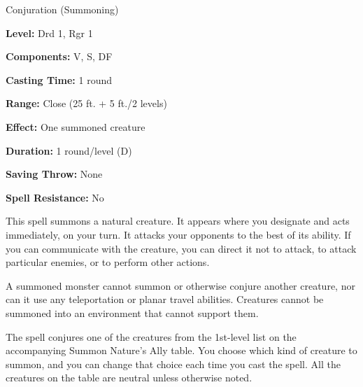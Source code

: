 
Conjuration (Summoning)

\textbf{Level:} Drd 1, Rgr 1

\textbf{Components:} V, S, DF

\textbf{Casting Time:} 1 round

\textbf{Range:} Close (25 ft. + 5 ft./2 levels)

\textbf{Effect:} One summoned creature

\textbf{Duration:} 1 round/level (D)

\textbf{Saving Throw:} None

\textbf{Spell Resistance:} No

This spell summons a natural creature. It appears where you designate and acts 
immediately, on your turn. It attacks your opponents to the best of its ability. 
If you can communicate with the creature, you can direct it not to attack, to attack 
particular enemies, or to perform other actions.

A summoned monster cannot summon or otherwise conjure another creature, nor can 
it use any teleportation or planar travel abilities. Creatures cannot be summoned 
into an environment that cannot support them.

The spell conjures one of the creatures from the 1st-level list on the accompanying 
Summon Nature's Ally table. You choose which kind of creature to summon, and you 
can change that choice each time you cast the spell. All the creatures on the table 
are neutral unless otherwise noted.

